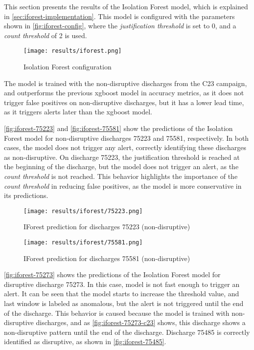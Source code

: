 This section presents the results of the Isolation Forest model, which is explained in \autoref{sec:iforest-implementation}. This model is configured with the parameters shown in \autoref{fig:iforest-config}, where the \textit{justification threshold} is set to 0, and a \textit{count threshold} of 2 is used. 

\begin{figure}[H]
    \centering
    \texttt{[image: results/iforest.png]}
    \caption{Isolation Forest configuration}
    \label{fig:iforest-config}
\end{figure}


The model is trained with the non-disruptive discharges from the C23 campaign, and outperforms the previous xgboost model in accuracy metrics, as it does not trigger false positives on non-disruptive discharges, but it has a lower lead time, as it triggers alerts later than the xgboost model.

\autoref{fig:iforest-75223} and \autoref{fig:iforest-75581} show the predictions of the Isolation Forest model for non-disruptive discharges 75223 and 75581, respectively. In both cases, the model does not trigger any alert, correctly identifying these discharges as non-disruptive. On discharge 75223, the justification threshold is reached at the beginning of the discharge, but the model does not trigger an alert, as the \textit{count threshold} is not reached. This behavior highlights the importance of the \textit{count threshold} in reducing false positives, as the model is more conservative in its predictions.

\begin{figure}[H]
    \centering
    \texttt{[image: results/iforest/75223.png]}
    \caption{\ac{IForest} prediction for discharges 75223 (non-disruptive)}
    \label{fig:iforest-75223}
\end{figure}

\begin{figure}[H]
    \centering
    \texttt{[image: results/iforest/75581.png]}
    \caption{\ac{IForest} prediction for discharges 75581 (non-disruptive)}
    \label{fig:iforest-75581}
\end{figure}

\autoref{fig:iforest-75273}  shows the predictions of the Isolation Forest model for disruptive discharge 75273. In this case, model is not fast enough to trigger an alert. It can be seen that the model starts to increase the threshold value, and last window is labeled as anomalous, but the alert is not triggered until the end of the discharge. This behavior is caused because the model is trained with non-disruptive discharges, and as \autoref{fig:iforest-75273-c23} shows, this discharge shows a non-disruptive pattern until the end of the discharge. Discharge 75485 is correctly identified as disruptive, as shown in \autoref{fig:iforest-75485}.

